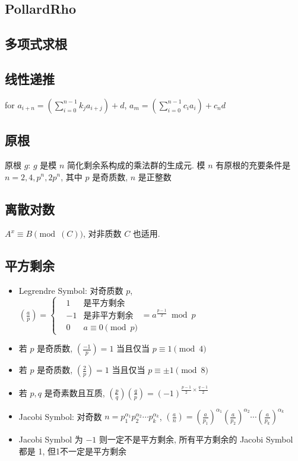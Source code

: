 \documentclass[landscape, twocolumn, 8pt, a4paper, twoside]{extarticle}
\begin{document}
  \subsection{PollardRho}
    

  \subsection{多项式求根}
    
  
  \subsection{线性递推}
    for $a_{i + n} = (\sum_{i = 0}^{n - 1} k_j a_{i + j}) + d$,
    $a_m = (\sum_{i = 0}^{n - 1} c_i a_i) + c_n d$
    

  \subsection{原根}
    原根 $g$: $g$ 是模 $n$ 简化剩余系构成的乘法群的生成元.
    模 $n$ 有原根的充要条件是 $n = 2, 4, p^n, 2p^n$, 其中 $p$ 是奇质数, $n$ 是正整数
    

  \subsection{离散对数}
    $A ^ x \equiv B \pmod(C)$, 对非质数 $C$ 也适用.
  

  \subsection{平方剩余}
    \begin{itemize}
    \item Legrendre Symbol: 对奇质数 $p$, $(\frac{a}{p}) =
      \left\{
      \begin{aligned}
      &  1 & \textrm{是平方剩余} \\
      & -1 & \textrm{是非平方剩余} \\
      &  0 & \textrm{$a \equiv 0 \pmod{p}$}
      \end{aligned}
      \right.
      = a^{\frac{p - 1}{2}} \bmod{p} $
    \item 若 $p$ 是奇质数, $(\frac{-1}{p}) = 1$ 当且仅当 $p \equiv 1 \pmod{4}$
    \item 若 $p$ 是奇质数, $(\frac{ 2}{p}) = 1$ 当且仅当 $p \equiv \pm 1 \pmod{8}$
    \item 若 $p, q$ 是奇素数且互质, $(\frac{p}{q})(\frac{q}{p}) = (-1)^{\frac{p - 1}{2} \times \frac{q - 1}{2}}$
    \item Jacobi Symbol: 对奇数 $n = p_1^{\alpha_1} p_2^{\alpha_2} \cdots p_k ^ {\alpha_k} $, 
                         $(\frac{a}{n}) = (\frac{a}{p_1})^{\alpha_1} (\frac{a}{p_2})^{\alpha_2} \cdots (\frac{a}{p_k})^{\alpha_k}$
    \item Jacobi Symbol 为 $-1$ 则一定不是平方剩余, 所有平方剩余的 Jacobi Symbol 都是 1, 但1不一定是平方剩余
    \end{itemize}
\end{document}

